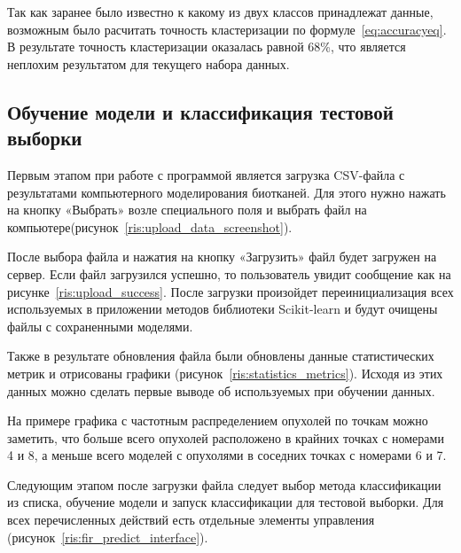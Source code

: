 Так как заранее было известно к какому из двух классов принадлежат данные, возможным было расчитать точность кластеризации по формуле~\eqref{eq:accuracyeq}. В результате точность кластеризации оказалась равной 68\%, что является неплохим результатом для текущего набора данных.

\subsection{Обучение модели и классификация тестовой выборки}
Первым этапом при работе с программой является загрузка CSV-файла с результатами компьютерного моделирования биотканей. Для этого нужно нажать на кнопку «Выбрать» возле специального поля и выбрать файл на компьютере(рисунок~\ref{ris:upload_data_screenshot}).
\par
После выбора файла и нажатия на кнопку «Загрузить» файл будет загружен на сервер. Если файл загрузился успешно, то пользователь увидит сообщение как на рисунке~\ref{ris:upload_success}. После загрузки произойдет переинициализация всех используемых в приложении методов библиотеки Scikit-learn и будут очищены файлы с сохраненными моделями.
\par
Также в результате обновления файла были обновлены данные статистических метрик и отрисованы графики (рисунок~\ref{ris:statistics_metrics}). Исходя из этих данных можно сделать первые выводе об используемых при обучении данных. 
\par
На примере графика с частотным распределением опухолей по точкам можно заметить, что больше всего опухолей расположено в крайних точках с номерами 4 и 8, а меньше всего моделей с опухолями в соседних точках с номерами 6 и 7.
\par
Следующим этапом после загрузки файла следует выбор метода классификации из списка, обучение модели и запуск классификации для тестовой выборки. Для всех перечисленных действий есть отдельные элементы управления (рисунок~\ref{ris:fir_predict_interface}). 


